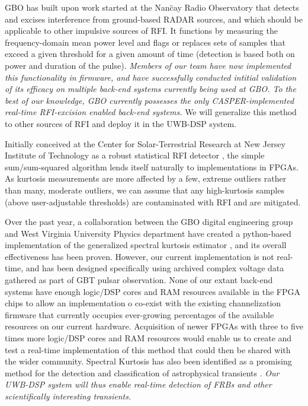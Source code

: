 \documentclass[10pt]{myNSF}
\begin{document}
 GBO has built upon
work started at the Nan\"{c}ay Radio Observatory \citep{dwr17} that
detects and excises interference from ground-based RADAR sources, and
which should be applicable to other impulsive sources of RFI.  It
functions by measuring the frequency-domain mean power level and flags
or replaces sets of samples that exceed a given threshold for a given
amount of time (detection is based both on power and duration of the
pulse).  \emph{Members of our team have now implemented this
  functionality in firmware, and have successfully conducted intitial
  validation of its efficacy on multiple back-end systems currently
  being used at GBO.  To the best of our knowledge, GBO currently
  possesses the only CASPER-implemented real-time RFI-excision enabled
  back-end systems.}  We will generalize this method to other sources
of RFI and deploy it in the UWB-DSP system.

 Initially conceived at the Center for
Solar-Terrestrial Research at New Jersey Institute of Technology as a
robust statistical RFI detector \citep{ng10,nhmg16}, the simple
sum/sum-squared algorithm lends itself naturally to implementations in
FPGAs.  As kurtosis measurements are more affected by a few, extreme
outliers rather than many, moderate outliers, we can assume that any
high-kurtosis samples (above user-adjustable thresholds) are
contaminated with RFI and are mitigated.  

Over the past year, a collaboration between the GBO digital
engineering group and West Virginia University Physics department have
created a python-based implementation of the generalized spectral
kurtosis estimator \citep{ng10}, and its overall effectiveness has
been proven. However, our current implementation is not real-time, and
has been designed specifically using archived complex voltage data
gathered as part of GBT pulsar observation.  None of our extant
back-end systems have enough logic/DSP cores and RAM resources
available in the FPGA chips to allow an implementation o co-exist with
the existing channelization firmware that currently occupies
ever-growing percentages of the available resources on our current
hardware. Acquisition of newer FPGAs with three to five times more
logic/DSP cores and RAM resources would enable us to create and test a
real-time implementation of this method that could then be shared with
the wider community.  Spectral Kurtosis has also been identified as a
promising method for the detection and classification of astrophysical
transients \cite{nhmg16}.  \emph{Our UWB-DSP system will thus enable
  real-time detection of FRBs and other scientifically interesting
  transients.}
\end{document}

